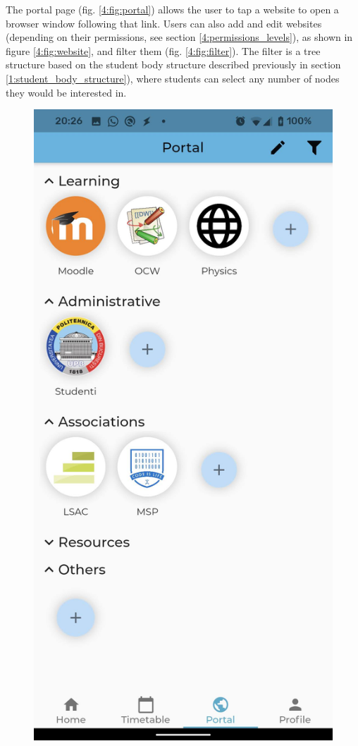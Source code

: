 The portal page (fig. \ref{4:fig:portal}) allows the user to tap a website to open a browser window following that link. Users can also add and edit websites (depending on their permissions, see section \ref{4:permissions_levels}), as shown in figure \ref{4:fig:website}, and filter them (fig. \ref{4:fig:filter}). The filter is a tree structure based on the student body structure described previously in section \ref{1:student_body_structure}), where students can select any number of nodes they would be interested in.

\clearpage

\begin{figure}[!ht]
    \centering
    \begin{minipage}[b]{0.26\textwidth}
        \captionsetup{justification=centering}
        \includegraphics[width=\textwidth]{figures/app/flutter/portal.jpg}

\end{minipage}
\end{figure}
